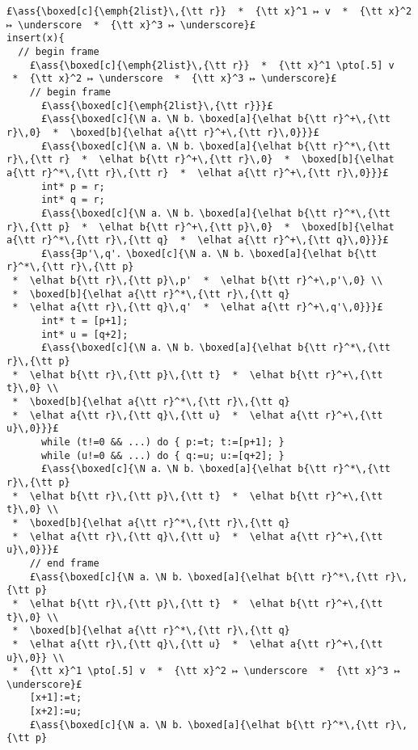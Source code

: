 \documentclass[12pt,a4paper]{article}
\makeatletter
\newcommand{\ml}[2][t]{\mbox{\mdseries\begin{tabular}[#1]{@{}L@{}}#2\end{tabular}}}
\newcommand{\ass}[1]{\ensuremath{{\color{blue}\left\{\ml[c]{#1}\right\}}}}
\makeatother
\begin{document}
\begin{lstlisting}
£\ass{\boxed[c]{\emph{2list}\,{\tt r}}  *  {\tt x}^1 ↦ v  *  {\tt x}^2 ↦ \underscore  *  {\tt x}^3 ↦ \underscore}£
insert(x){
  // begin frame
    £\ass{\boxed[c]{\emph{2list}\,{\tt r}}  *  {\tt x}^1 \pto[.5] v  *  {\tt x}^2 ↦ \underscore  *  {\tt x}^3 ↦ \underscore}£
    // begin frame
      £\ass{\boxed[c]{\emph{2list}\,{\tt r}}}£
      £\ass{\boxed[c]{\N a．\N b．\boxed[a]{\elhat b{\tt r}^+\,{\tt r}\,0}  *  \boxed[b]{\elhat a{\tt r}^+\,{\tt r}\,0}}}£
      £\ass{\boxed[c]{\N a．\N b．\boxed[a]{\elhat b{\tt r}^*\,{\tt r}\,{\tt r}  *  \elhat b{\tt r}^+\,{\tt r}\,0}  *  \boxed[b]{\elhat a{\tt r}^*\,{\tt r}\,{\tt r}  *  \elhat a{\tt r}^+\,{\tt r}\,0}}}£
      int* p = r;
      int* q = r;
      £\ass{\boxed[c]{\N a．\N b．\boxed[a]{\elhat b{\tt r}^*\,{\tt r}\,{\tt p}  *  \elhat b{\tt r}^+\,{\tt p}\,0}  *  \boxed[b]{\elhat a{\tt r}^*\,{\tt r}\,{\tt q}  *  \elhat a{\tt r}^+\,{\tt q}\,0}}}£
      £\ass{∃p'\,q'．\boxed[c]{\N a．\N b．\boxed[a]{\elhat b{\tt r}^*\,{\tt r}\,{\tt p} 
 *  \elhat b{\tt r}\,{\tt p}\,p'  *  \elhat b{\tt r}^+\,p'\,0} \\ 
 *  \boxed[b]{\elhat a{\tt r}^*\,{\tt r}\,{\tt q} 
 *  \elhat a{\tt r}\,{\tt q}\,q'  *  \elhat a{\tt r}^+\,q'\,0}}}£
      int* t = [p+1];
      int* u = [q+2];
      £\ass{\boxed[c]{\N a．\N b．\boxed[a]{\elhat b{\tt r}^*\,{\tt r}\,{\tt p} 
 *  \elhat b{\tt r}\,{\tt p}\,{\tt t}  *  \elhat b{\tt r}^+\,{\tt t}\,0} \\ 
 *  \boxed[b]{\elhat a{\tt r}^*\,{\tt r}\,{\tt q} 
 *  \elhat a{\tt r}\,{\tt q}\,{\tt u}  *  \elhat a{\tt r}^+\,{\tt u}\,0}}}£
      while (t!=0 && ...) do { p:=t; t:=[p+1]; }
      while (u!=0 && ...) do { q:=u; u:=[q+2]; }
      £\ass{\boxed[c]{\N a．\N b．\boxed[a]{\elhat b{\tt r}^*\,{\tt r}\,{\tt p} 
 *  \elhat b{\tt r}\,{\tt p}\,{\tt t}  *  \elhat b{\tt r}^+\,{\tt t}\,0} \\ 
 *  \boxed[b]{\elhat a{\tt r}^*\,{\tt r}\,{\tt q} 
 *  \elhat a{\tt r}\,{\tt q}\,{\tt u}  *  \elhat a{\tt r}^+\,{\tt u}\,0}}}£
    // end frame
    £\ass{\boxed[c]{\N a．\N b．\boxed[a]{\elhat b{\tt r}^*\,{\tt r}\,{\tt p} 
 *  \elhat b{\tt r}\,{\tt p}\,{\tt t}  *  \elhat b{\tt r}^+\,{\tt t}\,0} \\ 
 *  \boxed[b]{\elhat a{\tt r}^*\,{\tt r}\,{\tt q} 
 *  \elhat a{\tt r}\,{\tt q}\,{\tt u}  *  \elhat a{\tt r}^+\,{\tt u}\,0}} \\
 *  {\tt x}^1 \pto[.5] v  *  {\tt x}^2 ↦ \underscore  *  {\tt x}^3 ↦ \underscore}£
    [x+1]:=t;
    [x+2]:=u;
    £\ass{\boxed[c]{\N a．\N b．\boxed[a]{\elhat b{\tt r}^*\,{\tt r}\,{\tt p} 

\end{lstlisting}
\end{document}
